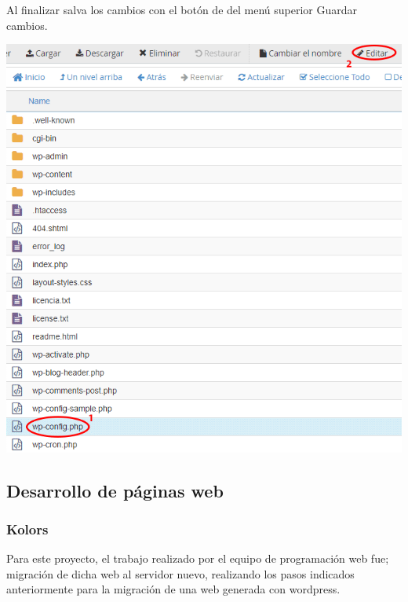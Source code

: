 \begin{enumerate}
		Al finalizar salva los cambios con el botón de del menú superior Guardar cambios.
		
		\begin{center}
			\includegraphics[scale=0.4]{image/migra19.png}
		\end{center} 
		
	\end{enumerate}

		\newpage
		
		\subsection{Desarrollo de páginas web}
		
		\subsubsection{Kolors}
		
		Para este proyecto, el trabajo realizado por el equipo de programación web fue; migración de dicha web al servidor nuevo, realizando los pasos indicados anteriormente para la migración de una web generada con wordpress.\\
		
